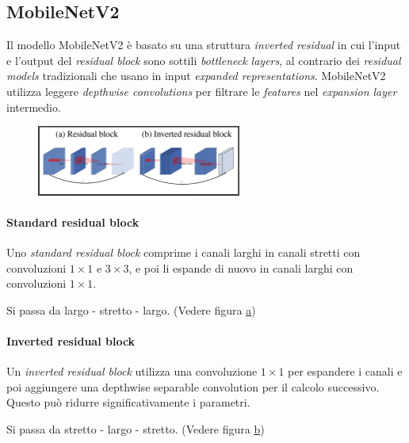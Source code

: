     \subsection{MobileNetV2}
    \label{MobileNetV2}
    Il modello MobileNetV2 %
    \cite{sandler2018mobilenetv2} è basato su una struttura \textit{inverted residual} in cui l'input e l'output del \textit{residual block} sono sottili\textit{ bottleneck layers}, al contrario dei \textit{residual models} tradizionali che usano in input \textit{expanded representations}.
    MobileNetV2 utilizza leggere \textit{depthwise convolutions} per filtrare le \textit{features} nel \textit{expansion layer }intermedio.
        \begin{figure}[!h]
            \centering
            \includegraphics[width=0.6\textwidth]{Images/Modelli/MobileNetV2/Inverted residual block.png}
            \label{MobileNetV2 blocks}
        \end{figure}
        
        \paragraph{Standard residual block}
        Uno\textit{ standard residual block} comprime i canali larghi in canali stretti con convoluzioni $1\times1$ e $3\times3$, e poi li espande di nuovo in canali larghi con convoluzioni $1\times1$.
        
        Si passa da largo - stretto - largo. (Vedere figura \hyperref[MobileNetV2 blocks]{a})
        
        \paragraph{Inverted residual block}
        Un \textit{inverted residual block} utilizza una convoluzione $1\times1$ per espandere i canali e poi aggiungere una depthwise separable convolution per il calcolo successivo. Questo può ridurre significativamente i parametri.
        
        Si passa da stretto - largo - stretto. (Vedere figura \hyperref[MobileNetV2 blocks]{b})
    
